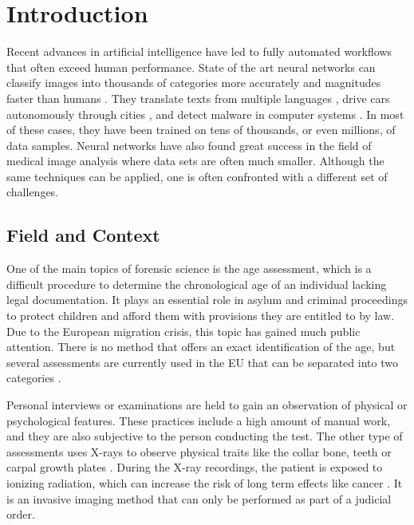 \section{Introduction}

Recent advances in artificial intelligence have led to fully automated workflows that often exceed human performance. State of the art neural networks can classify images into thousands of categories more accurately and magnitudes faster than humans \cite{He2015a}. They translate texts from multiple languages \cite{Wu2016}, drive cars autonomously through cities \cite{Bojarski2017}, and detect malware in computer systems \cite{Saxe2015}. In most of these cases, they have been trained on tens of thousands, or even millions, of data samples. Neural networks have also found great success in the field of medical image analysis where data sets are often much smaller. Although the same techniques can be applied, one is often confronted with a different set of challenges.

\subsection{Field and Context}

One of the main topics of forensic science is the age assessment, which is a difficult procedure to determine the chronological age of an individual lacking legal documentation. It plays an essential role in asylum and criminal proceedings to protect children and afford them with provisions they are entitled to by law. Due to the European migration crisis, this topic has gained much public attention. There is no method that offers an exact identification of the age, but several assessments are currently used in the EU that can be separated into two categories \cite{EuropeanAsylumSupportOffice2013}.

Personal interviews or examinations are held to gain an observation of physical or psychological features. These practices include a high amount of manual work, and they are also subjective to the person conducting the test. The other type of assessments uses X-rays to observe physical traits like the collar bone, teeth or carpal growth plates \cite{EuropeanAsylumSupportOffice2013}. During the X-ray recordings, the patient is exposed to ionizing radiation, which can increase the risk of long term effects like cancer \cite{WorldHealthOrganization2016}. It is an invasive imaging method that can only be performed as part of a judicial order. 

